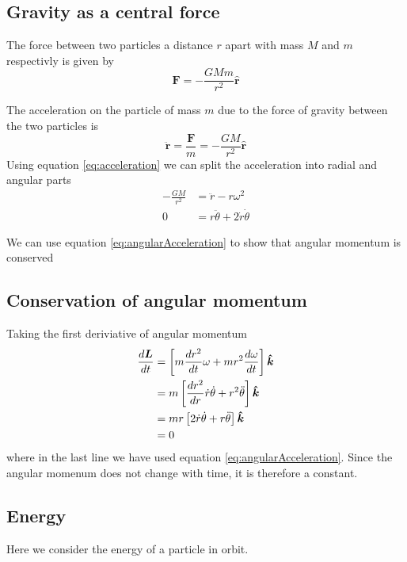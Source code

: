 \subsection{Gravity as a central force}
The force between two particles a distance $r$ apart with mass $M$ and $m$ respectivly is given by
\begin{equation}
\bm{F}=-\frac{G M m}{r^2} \hat{\bm{r}}
\end{equation}

The acceleration on the particle of mass $m$ due to the force of gravity between the two particles is
\begin{equation}
\ddot{\bm{r}} =\frac{ \bm{F} }{m}=-\frac{GM}{r^2} \hat{\bm{r}}
\end{equation}
Using equation \ref{eq:acceleration} we can split the acceleration into radial and angular parts
\begin{align}
-\frac{GM}{r^2} &=\ddot{r} - r \omega^2 \label{eq:radialAcceleration} \\
0 &=r \ddot{\theta} + 2 \dot{r} \dot{\theta} \label{eq:angularAcceleration}
\end{align}

We can use equation \ref{eq:angularAcceleration} to show that angular momentum is conserved
\subsection{Conservation of angular momentum}
Taking the first deriviative of angular momentum
\begin{align}
\frac{d \bm{L}}{d t} &= \left[m \frac{d r^2}{d t} \omega + m r^2 \frac{d \omega}{d t} \right] {\bm{\hat{\bm{k}}}} \nonumber \\
&=m \left[ \frac{d r^2}{d r}\dot{r}\dot{\theta}+ r^2  \ddot{\theta} \right] {\bm{\hat{\bm{k}}}} \nonumber \\
&=mr \left[2\dot{r}\dot{\theta}+ r  \ddot{\theta} \right] {\bm{\hat{\bm{k}}}} \nonumber \\
&=0
\end{align}
where in the last line we have used equation \ref{eq:angularAcceleration}. Since the angular momenum does not change with time, it is therefore a constant.

\subsection{Energy}
Here we consider the energy of a particle in orbit.
